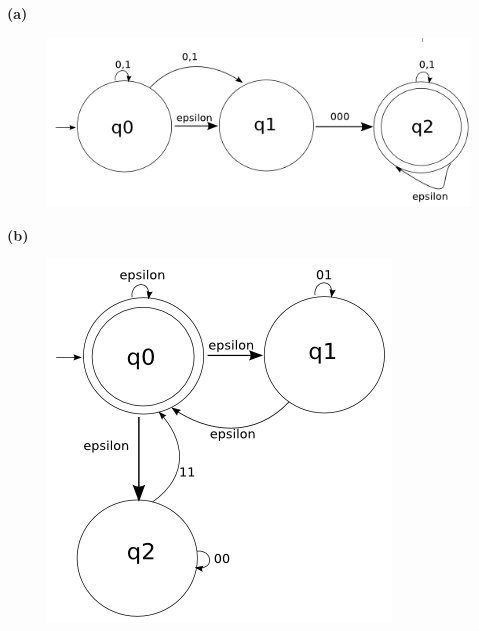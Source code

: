 \documentclass[11pt]{article}
\newcommand{\question}[2] {\vspace{.25in} \fbox{#1} #2 \vspace{.10in}}
\renewcommand{\part}[1] {\vspace{.10in} {\bf (#1)}}
\begin{document}
\question{4}{}

 \part{a}
  \begin{figure}[h!]
    \begin{center}
      \includegraphics[scale=0.40]{19a.png}
    \end{center}
  \end{figure}


\pagebreak 
 \part{b}
  \begin{figure}[h!]
    \begin{center}
      \includegraphics[scale=0.40]{19b.png}
    \end{center}
  \end{figure}
\end{document}
